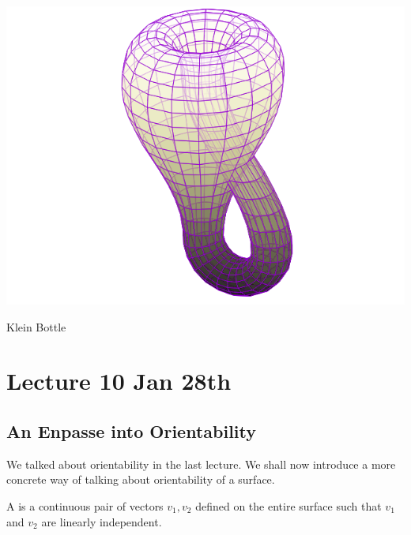 \documentclass[notoc,notitlepage]{tufte-book}
\begin{document}
\begin{marginfigure}
  \centering
  \includegraphics[width=\marginparwidth]{images/klein-bottle1.png}
  \caption{Klein Bottle}
  \label{fig:klein_bottle}
\end{marginfigure}



\chapter{Lecture 10 Jan 28th}%
\label{chp:lecture_10_jan_28th}

\section{An Enpasse into Orientability}%
\label{sec:an_enpasse_into_orientability}

We talked about orientability in the last lecture. We shall now introduce a more concrete
way of talking about orientability of a surface.

\begin{defn}[Frame]\label{defn:frame}
  A  is a continuous pair of vectors $v_1, v_2$ defined on the entire
  surface such that $v_1$ and $v_2$ are linearly independent.
\end{defn}
\end{document}
